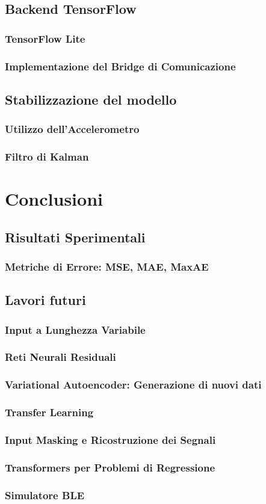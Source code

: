 \documentclass[12pt]{report}
\begin{document}
\section{Backend TensorFlow}
\subsection{TensorFlow Lite}
\subsection{Implementazione del Bridge di Comunicazione}
\section{Stabilizzazione del modello}
\subsection{Utilizzo dell'Accelerometro}
\subsection{Filtro di Kalman}

\chapter{Conclusioni}
\section{Risultati Sperimentali}
\subsection{Metriche di Errore: MSE, MAE, MaxAE}

\section{Lavori futuri}
\subsection{Input a Lunghezza Variabile}
\subsection{Reti Neurali Residuali}
\subsection{Variational Autoencoder: Generazione di nuovi dati}
\subsection{Transfer Learning}
\subsection{Input Masking e Ricostruzione dei Segnali}
\subsection{Transformers per Problemi di Regressione}
\subsection{Simulatore BLE}

\appendix



\end{document}
